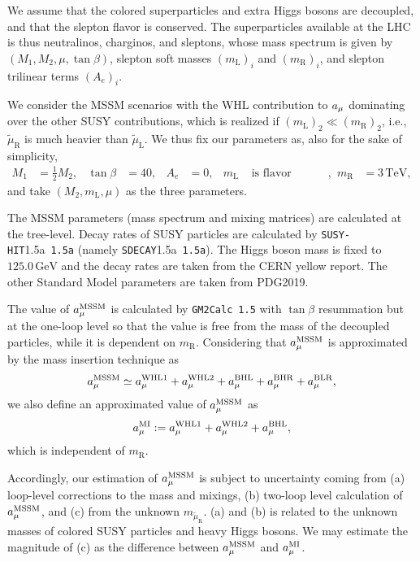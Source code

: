 \documentclass[a4paper,10pt,captions=tableheading,DIV=14]{scrartcl}
\numberwithin{equation}{section}
\newcommand\w[1]{_{\mathrm{#1}}}
\newcommand\unit[1]{\,\mathrm{#1}\xspace}
\newcommand\GeV{\unit{GeV}}
\newcommand\TeV{\unit{TeV}}
\newcommand\amu[1][\relax]{\ifx#1\relax{a_\mu}\else{a_\mu^{\mathrm{#1}}}\fi}
\newcommand\smuL{\tilde\mu\w L}
\newcommand\smuR{\tilde\mu\w R}
\newcommand\package[2][\relax]{\texttt{#2}\ifx#1\relax\relax\else~\texttt{#1}\fi}
\begin{document}
We assume that the colored superparticles and extra Higgs bosons are decoupled, and that the slepton flavor is conserved.
The superparticles available at the LHC is thus neutralinos, charginos, and sleptons, whose mass spectrum is given by $(M_1, M_2, \mu, \tan\beta)$, slepton soft masses $(m\w L)_{i}$ and $(m\w R)_{i}$, and slepton trilinear terms $(A_e)_{i}$.

We consider the MSSM scenarios with the WHL contribution to $\amu$ dominating over the other SUSY contributions, which is realized if $(m\w L)_2\ll (m\w R)_2$, i.e., $\smuR$ is much heavier than $\smuL$.
We thus fix our parameters as, also for the sake of simplicity,
\begin{align}
 M_1 & =\frac12 M_2, &
 \tan\beta &= 40, &
 A_e & = 0, &
 m\w L & \text{ is flavor independent}, &
 m\w R & = 3\TeV,
\end{align}
and take $(M_2, m\w L, \mu)$ as the three parameters.

The MSSM parameters (mass spectrum and mixing matrices) are calculated at the tree-level.
Decay rates of SUSY particles are calculated by \package[1.5a]{SUSY-HIT} (namely \package[1.5a]{SDECAY}).
The Higgs boson mass is fixed to $125.0\GeV$ and the decay rates are taken from the CERN yellow report.
The other Standard Model parameters are taken from PDG2019.

The value of $\amu[MSSM]$ is calculated by \package[1.5]{GM2Calc} with $\tan\beta$ resummation but at the one-loop level so that the value is free from the mass of the decoupled particles, while it is dependent on $m\w R$.
Considering that $\amu[MSSM]$ is approximated by the mass insertion technique as
\begin{equation}
 \amu[MSSM]\simeq \amu[WHL1]+\amu[WHL2]+\amu[BHL]+\amu[BHR]+\amu[BLR],
\end{equation}
we also define an approximated value of $\amu[MSSM]$ as
\begin{equation}
 \amu[MI]:=\amu[WHL1] + \amu[WHL2] + \amu[BHL],
\end{equation}
which is independent of $m\w R$.

Accordingly, our estimation of $\amu[MSSM]$ is subject to uncertainty coming from (a) loop-level corrections to the mass and mixings, (b) two-loop level calculation of $\amu[MSSM]$, and (c) from the unknown $m_{\smuR}$.
(a) and (b) is related to the unknown masses of colored SUSY particles and heavy Higgs bosons.
We may estimate the magnitude of (c) as the difference between $\amu[MSSM]$ and $\amu[MI]$.
\end{document}
